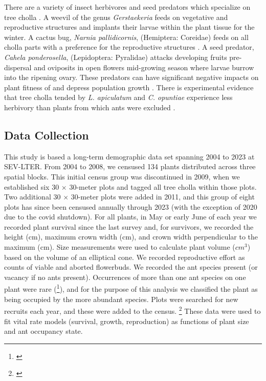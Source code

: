 \documentclass[11pt]{article}
\newcommand{\tom}[2]{{\color{red}{#1}}\footnote{\textit{\color{red}{#2}}}}
\begin{document}
There are a variety of insect herbivores and seed predators which specialize on tree cholla \citep{Mann1969}. 
A weevil of the genus \textit{Gerstaekeria} feeds on vegetative and reproductive structures and implants their larvae within the plant tissue for the winter. 
A cactus bug, \textit{Narnia pallidicornis}, (Hemiptera: Coreidae) feeds on all cholla parts with a preference for the reproductive structures \citep{Miller2006}.
A seed predator, \textit{Cahela ponderosella}, (Lepidoptera: Pyralidae) attacks developing fruits pre-dispersal and oviposits in open flowers mid-growing season where larvae burrow into the ripening ovary. 
These predators can have significant negative impacts on plant fitness of and depress population growth \citep{Miller2009}.
There is experimental evidence that tree cholla tended by \textit{L. apiculatum} and \textit{C. opuntiae} experience less herbivory than plants from which ants were excluded \citep{Miller2007}. 

\subsection*{Data Collection}
This study is based a long-term demographic data set spanning 2004 to 2023 at SEV-LTER. 
From 2004 to 2008, we censused 134 plants distributed across three spatial blocks. 
This initial census group was discontinued in 2009, when we established six 30 $\times$ 30-meter plots and tagged all tree cholla within those plots. 
Two additional 30 $\times$ 30-meter plots were added in 2011, and this group of eight plots has since been censused annually through 2023 (with the exception of 2020 due to the covid shutdown). 
For all plants, in May or early June of each year we recorded plant survival since the last survey and, for survivors, we recorded the height (cm), maximum crown width (cm), and crown width perpendicular to the maximum (cm).
Size measurements were used to calculate plant volume ($cm^3$) based on the volume of an elliptical cone. 
We recorded reproductive effort as counts of viable and aborted flowerbuds. 
We recorded the ant species present (or vacancy if no ants present).
Occurrences of more than one ant species on one plant were rare (\tom{}{quantify}), and for the purpose of this analysis we classified the plant as being occupied by the more abundant species. 
Plots were searched for new recruits each year, and these were added to the census.
\tom{In total, the data set included \# unique individuals and \# plant-year observations. }{update numbers}
These data were used to fit vital rate models (survival, growth, reproduction) as functions of plant size and ant occupancy state. 
\end{document}
